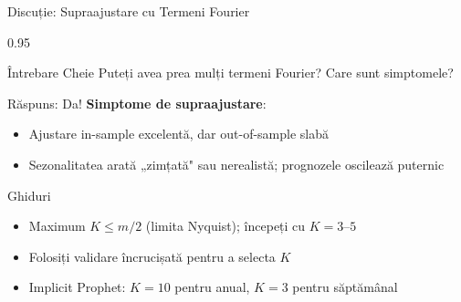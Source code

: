 \documentclass[9pt, aspectratio=169, t]{beamer}
\begin{document}
\begin{frame}{Discuție: Supraajustare cu Termeni Fourier}
    \begin{cminipage}{0.95\textwidth}
    {\small
    \begin{alertblock}{Întrebare Cheie}
        Puteți avea prea mulți termeni Fourier? Care sunt simptomele?
    \end{alertblock}
    \vspace{-1mm}
    \begin{block}{Răspuns: Da!}
        \textbf{Simptome de supraajustare}:
        \begin{itemize}\setlength{\itemsep}{0pt}
            \item Ajustare in-sample excelentă, dar out-of-sample slabă
            \item Sezonalitatea arată „zimțată" sau nerealistă; prognozele oscilează puternic
        \end{itemize}
    \end{block}
    \vspace{-1mm}
    \begin{exampleblock}{Ghiduri}
        \begin{itemize}\setlength{\itemsep}{0pt}
            \item Maximum $K \leq m/2$ (limita Nyquist); începeți cu $K = 3$--$5$
            \item Folosiți validare încrucișată pentru a selecta $K$
            \item Implicit Prophet: $K=10$ pentru anual, $K=3$ pentru săptămânal
        \end{itemize}
    \end{exampleblock}
    }
    \end{cminipage}
\end{frame}
\end{document}
